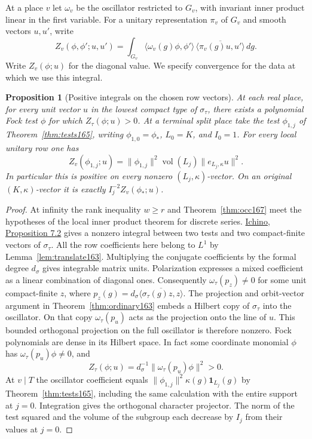 \documentclass[a4paper,11pt]{article}
\newtheorem{proposition}{Proposition}[section]
\theoremstyle{definition}
\theoremstyle{remark}
\numberwithin{equation}{section}
\begin{document}
At a place \(v\) let \(\omega_v\) be the oscillator restricted
to \(G_v\), with invariant inner product linear in the first
variable. For a unitary representation \(\pi_v\) of \(G_v\)
and smooth vectors \(u,u'\), write
\[
 Z_v(\phi,\phi';u,u')=\int_{G_v}
 \langle\omega_v(g)\phi,\phi'\rangle\,
 \overline{\langle\pi_v(g)u,u'\rangle}\,dg .
\]
Write \(Z_v(\phi;u)\) for the diagonal value. We specify
convergence for the data at which we use this integral.

\begin{proposition}[Positive integrals on the chosen row vectors]
\label{prop:local167}
At each real place, for every unit vector \(u\) in the lowest
compact type of \(\sigma_\tau\), there exists a polynomial
Fock test \(\phi\) for which \(Z_\tau(\phi;u)>0\).
At a terminal split place take the test \(\phi_{1,j}\) of
Theorem~\ref{thm:tests165}, writing \(\phi_{1,0}=\phi_*\),
\(L_0=K\), and \(I_0=1\). For every local unitary row one has
\[
 Z_v(\phi_{1,j};u)
   =\|\phi_{1,j}\|^2\operatorname{vol}(L_j)
       \|e_{L_j,\kappa}u\|^2 .
\]
In particular this is positive on every nonzero
\((L_j,\kappa)\)-vector. On an original \((K,\kappa)\)-vector
it is exactly \(I_j^{-2}Z_v(\phi_*;u)\).
\end{proposition}
\begin{proof}
At infinity the rank inequality \(w\ge r\) and
Theorem~\ref{thm:occ167} meet the hypotheses of the local
inner product theorem for discrete series.
\href{https://arxiv.org/pdf/2002.09148}{Ichino,
Proposition 7.2} gives a nonzero integral between two tests
and two compact-finite vectors of \(\sigma_\tau\).
All the row coefficients here belong to \(L^1\) by
Lemma~\ref{lem:translate163}. Multiplying the conjugate
coefficients by the formal degree \(d_\sigma\) gives
integrable matrix units. Polarization expresses a mixed
coefficient as a linear combination of diagonal ones.
Consequently \(\omega_\tau(p_z)\ne0\) for some unit
compact-finite \(z\), where
\(p_z(g)=d_\sigma\overline{\langle\sigma_\tau(g)z,z\rangle}\).
The projection and orbit-vector argument in
Theorem~\ref{thm:ordinary163} embeds a Hilbert copy of
\(\sigma_\tau\) into the oscillator. On that copy
\(\omega_\tau(p_u)\) acts as the projection onto the line
of \(u\). This bounded orthogonal projection on the full
oscillator is therefore nonzero. Fock polynomials are dense
in its Hilbert space. In fact some coordinate monomial \(\phi\) has
\(\omega_\tau(p_u)\phi\ne0\), and
\[
 Z_\tau(\phi;u)=d_\sigma^{-1}\|\omega_\tau(p_u)\phi\|^2>0 .
\]
At \(v\mid T\) the oscillator coefficient equals
\(\|\phi_{1,j}\|^2\kappa(g)\mathbf1_{L_j}(g)\) by
Theorem~\ref{thm:tests165}, including the same calculation
with the entire support at \(j=0\). Integration gives the
orthogonal character projector. The norm of the test squared
and the volume of the subgroup each decrease by \(I_j\)
from their values at \(j=0\).
\end{proof}
\end{document}
